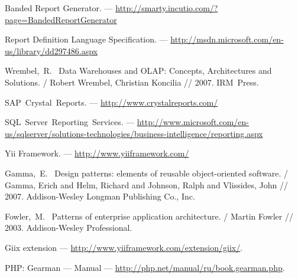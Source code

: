 Banded Report Generator. --- \url{http://smarty.incutio.com/?page=BandedReportGenerator}

Report Definition Language Specification. --- \url{http://msdn.microsoft.com/en-us/library/dd297486.aspx}

Wrembel,~R.~
Data Warehouses and OLAP: Concepts, Architectures and Solutions. /
Robert Wrembel, Christian Koncilia //
2007. IRM~Press.

SAP~Crystal~Reports. --- \url{http://www.crystalreports.com/}

SQL~Server~Reporting~Services. --- \url{http://www.microsoft.com/en-us/sqlserver/solutions-technologies/business-intelligence/reporting.aspx}

Yii Framework. --- \url{http://www.yiiframework.com/}

Gamma,~E.~
Design patterns: elements of reusable object-oriented software. /
Gamma, Erich and Helm, Richard and Johnson, Ralph and Vlissides, John //
2007. Addison-Wesley Longman Publishing Co., Inc.

Fowler,~M.~
Patterns of enterprise application architecture. /
Martin Fowler //
2003. Addison-Wesley Professional.

Giix extension --- \url{http://www.yiiframework.com/extension/giix/}.

PHP: Gearman --- Manual --- \url{http://php.net/manual/ru/book.gearman.php}.
